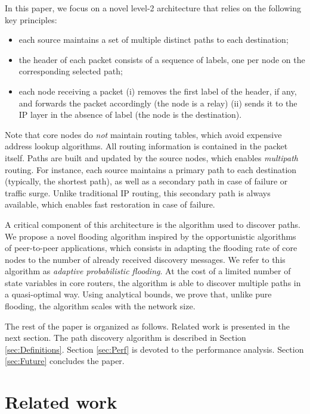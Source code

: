 \documentclass[conference]{IEEEtran}
\begin{document}
In this paper, we focus on a novel level-2 architecture 
that relies on the following key principles:
\begin{itemize}
\item each source maintains a set of multiple distinct paths to each destination;
\item the header of each packet consists of a sequence of labels, one per node on the corresponding selected path;
\item each node receiving  a packet  (i) removes the first label of the header, if any, and forwards the packet accordingly (the node is a relay) (ii) sends  it to the IP layer in the absence of label (the node is the destination).
\end{itemize} 
Note that core nodes do {\it not} maintain routing tables, which avoid expensive address lookup algorithms. All routing information is contained in the packet itself. Paths are built and updated by the source nodes, which enables {\it multipath} routing. For instance, each source maintains a primary path to each destination (typically, the shortest path), as well as a secondary path in case of failure or traffic surge. Unlike traditional IP routing, this secondary path  is always available, which enables fast restoration in case of failure. 

A critical component of this architecture is the algorithm used to discover paths. We propose a novel 
  flooding algorithm inspired by the opportunistic algorithms of peer-to-peer applications, which consists in adapting the flooding rate of core nodes to the number of already received discovery messages. 
We refer to this algorithm as {\it adaptive probabilistic flooding}. At the cost of a limited number of state variables  in core routers, the algorithm is able to discover multiple paths in a quasi-optimal way. Using analytical bounds, we prove that, unlike pure flooding, the algorithm scales with the network size.

The rest of the paper is organized as follows. Related work is presented in  the next section. 
The path discovery algorithm is  described in Section   \ref{sec:Definitions}.
Section \ref{sec:Perf} is devoted to the performance analysis. Section \ref{sec:Future} concludes the paper.


\section{Related work}\label{sec:Related}
\end{document}
